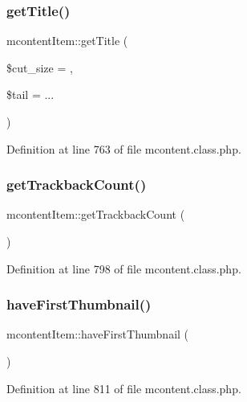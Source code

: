 \subsubsection{\texorpdfstring{get\+Title()}{getTitle()}}
{\footnotesize\ttfamily mcontent\+Item\+::get\+Title (\begin{DoxyParamCaption}\item[{}]{\$cut\+\_\+size = {},  }\item[{}]{\$tail = {\ttfamily \textquotesingle{}...\textquotesingle{}} }\end{DoxyParamCaption})}



Definition at line 763 of file mcontent.\+class.\+php.

\mbox{\label{classmcontentItem_afb955c421fa34f36c51edd795d3a00c7}} 
\subsubsection{\texorpdfstring{get\+Trackback\+Count()}{getTrackbackCount()}}
{\footnotesize\ttfamily mcontent\+Item\+::get\+Trackback\+Count (\begin{DoxyParamCaption}{ }\end{DoxyParamCaption})}



Definition at line 798 of file mcontent.\+class.\+php.

\mbox{\label{classmcontentItem_ac8b5fb3d84cdc8a96a8c02e9472e25dd}} 
\subsubsection{\texorpdfstring{have\+First\+Thumbnail()}{haveFirstThumbnail()}}
{\footnotesize\ttfamily mcontent\+Item\+::have\+First\+Thumbnail (\begin{DoxyParamCaption}{ }\end{DoxyParamCaption})}



Definition at line 811 of file mcontent.\+class.\+php.

